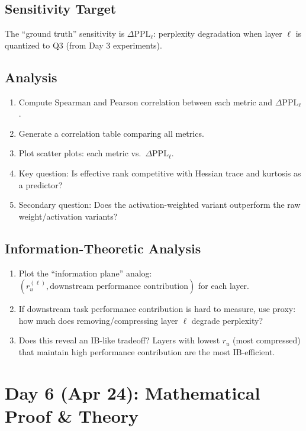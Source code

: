 \documentclass[11pt,a4paper]{article}
\begin{document}
\subsection{Sensitivity Target}
The ``ground truth'' sensitivity is $\Delta \text{PPL}_\ell$: perplexity degradation when layer $\ell$ is quantized to Q3 (from Day 3 experiments).

\subsection{Analysis}
\begin{enumerate}
    \item Compute Spearman and Pearson correlation between each metric and $\Delta \text{PPL}_\ell$.
    \item Generate a correlation table comparing all metrics.
    \item Plot scatter plots: each metric vs.\ $\Delta \text{PPL}_\ell$.
    \item Key question: Is effective rank competitive with Hessian trace and kurtosis as a predictor?
    \item Secondary question: Does the activation-weighted variant outperform the raw weight/activation variants?
\end{enumerate}

\subsection{Information-Theoretic Analysis}
\begin{enumerate}
    \item Plot the ``information plane'' analog: $(r_u^{(\ell)}, \text{downstream performance contribution})$ for each layer.
    \item If downstream task performance contribution is hard to measure, use proxy: how much does removing/compressing layer $\ell$ degrade perplexity?
    \item Does this reveal an IB-like tradeoff? Layers with lowest $r_u$ (most compressed) that maintain high performance contribution are the most IB-efficient.
\end{enumerate}

\section{Day 6 (Apr 24): Mathematical Proof \& Theory}
\end{document}
